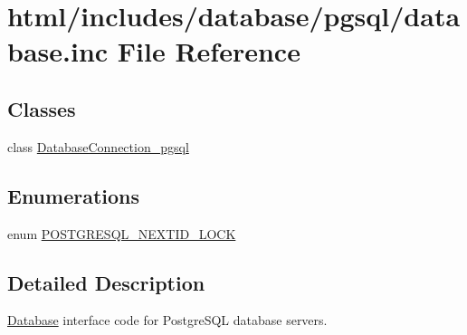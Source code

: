 \hypertarget{pgsql_2database_8inc}{
\section{html/includes/database/pgsql/database.inc File Reference}
\label{pgsql_2database_8inc}
}
\subsection*{Classes}
\begin{DoxyCompactItemize}
\item 
class \hyperlink{classDatabaseConnection__pgsql}{DatabaseConnection\_\-pgsql}
\end{DoxyCompactItemize}
\subsection*{Enumerations}
\begin{DoxyCompactItemize}
\item 
enum \hyperlink{group__database_ga9f09406f95a22d365c9faa8721f57126}{POSTGRESQL\_\-NEXTID\_\-LOCK} 
\end{DoxyCompactItemize}


\subsection{Detailed Description}
\hyperlink{classDatabase}{Database} interface code for PostgreSQL database servers. 